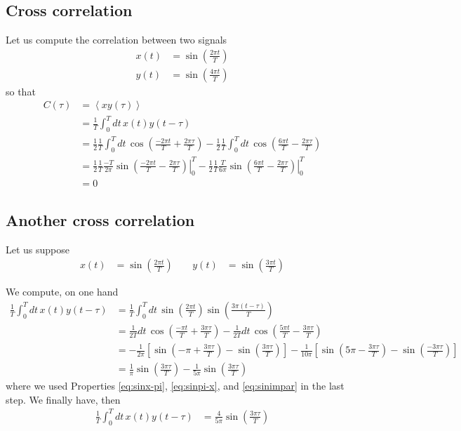 \documentclass{article}
\begin{document}
\subsection*{Cross correlation}
Let us compute the correlation between two signals
\begin{align}
  x(t)&= \sin \left( \frac{2 \pi t}{T} \right) \\
  y(t)&= \sin \left( \frac{4 \pi t}{T} \right)
\end{align}
so that
\begin{align}
  C(\tau) &= \left< x y(\tau) \right> \\
          &= \frac{1}{T}\int_0^{T} dt\, x(t) y(t-\tau) \\
          &= \frac{1}{2} \frac{1}{T} \int_0^T dt\, \cos\left( \frac{-2\pi t}{T} + \frac{2 \pi \tau}{T} \right)
           - \frac{1}{2} \frac{1}{T} \int_0^T dt\, \cos\left( \frac{ 6\pi t}{T} - \frac{2 \pi \tau}{T} \right) \\
           &=\frac{1}{2} \frac{1}{T} \left. \frac{-T}{2\pi} \sin \left(  \frac{-2\pi t}{T}- \frac{2 \pi \tau}{T} \right) \right|_{0}^{T}
             - \frac{1}{2} \frac{1}{T} \left. \frac{T}{6\pi} \sin \left(  \frac{6\pi t}{T}- \frac{2 \pi \tau}{T} \right) \right|_{0}^{T} \\
           &= 0
\end{align}


\subsection*{Another cross correlation}
Let us suppose 
\begin{align}
  x(t) &= \sin\left( \frac{2\pi t}{T}\right)\,\quad & y(t) &= \sin\left( \frac{3\pi t}{T}\right)
\end{align}

We compute, on one hand
\begin{align}
  \frac{1}{T} \int_0^T dt\, x(t) y(t-\tau) &=
  \frac{1}{T} \int_0^T dt\, \sin\left( \frac{2\pi t}{T}\right) \sin\left( \frac{3\pi (t-\tau)}{T}\right) \\
  &= \frac{1}{2T} dt\, \cos \left( \frac{-\pi t}{T} + \frac{3\pi \tau}{T}\right)
  -  \frac{1}{2T} dt\, \cos \left( \frac{5\pi t}{T} - \frac{3\pi \tau}{T}\right) \\
  &= 
  -\frac{1}{2\pi} \left[
    \sin\left(-\pi + \frac{3\pi\tau}{T} \right)
    - \sin\left(\frac{3\pi\tau}{T} \right)
  \right]
  -\frac{1}{10\pi} \left[
    \sin\left(5\pi - \frac{3\pi\tau}{T} \right)
    - \sin\left(\frac{-3\pi\tau}{T} \right)
  \right] \\
  &= \frac{1}{\pi} 
    \sin\left(\frac{3\pi\tau}{T} \right)
  -\frac{1}{5\pi}
    \sin\left(\frac{3\pi\tau}{T} \right)
\end{align}
where we used Properties \ref{eq:sinx-pi}, \ref{eq:sinpi-x}, and \ref{eq:sinimpar} in the last step. We finally have, then
\begin{align}
  \frac{1}{T} \int_0^T dt\, x(t) y(t-\tau) &=
 \frac{4}{5\pi} 
    \sin\left(\frac{3\pi\tau}{T} \right)
\end{align}
\end{document}
